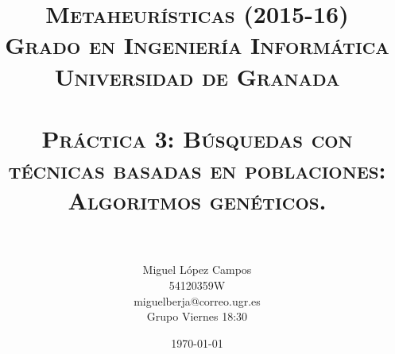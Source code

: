 

\title{
\normalfont \normalsize 
\textsc{{\bf Metaheurísticas (2015-16) \\ Grado en Ingeniería Informática \\ Universidad de Granada} \\ [25pt] %
\horrule{0.5pt} \\[0.4cm] %
\huge Práctica 3: Búsquedas con técnicas basadas en poblaciones: Algoritmos genéticos. \\ %
\horrule{2pt} \\[0.5cm] %
}}
\author{Miguel López Campos\\ 54120359W\\ miguelberja@correo.ugr.es\\ Grupo Viernes 18:30} %


\date{\normalsize\today} %


	
	\maketitle %
	\newpage %
	
	\tableofcontents %
	\listoffigures

	
	\newpage
	
	\
	
	
	
